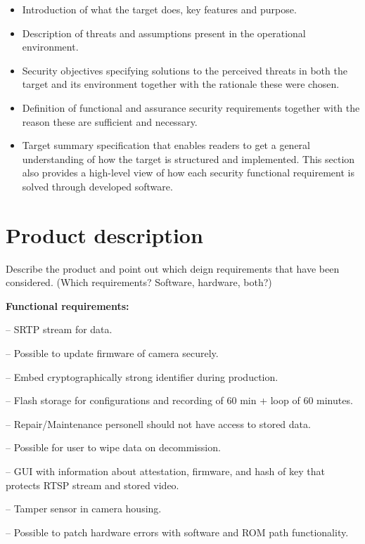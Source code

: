 \documentclass[10pt]{article}
\newcommand{\comm}[1]{{\leavevmode\color{gray}#1}}
\newenvironment{checklist}{%
  \begin{list}{}{}%
  \let\olditem\item
  \renewcommand\item{\olditem -- \marginpar{$\Box$} }
  \newcommand\checkeditem{\olditem -- \marginpar{$\CheckedBox$} }
}{%
  \end{list}
}
\begin{document}
        \begin{itemize}
          \item{Introduction of what the target does, key features and purpose.}
          \item{Description of threats and assumptions present in the
            operational environment.}
          \item{Security objectives specifying solutions to the perceived
            threats in both the target and its environment together with the
            rationale these were chosen.}
          \item{Definition of functional and assurance security requirements
            together with the reason these are sufficient and necessary.}
          \item{Target summary specification that enables readers to get a
            general understanding of how the target is structured and
            implemented. This section also provides a high-level view of how
            each security functional requirement is solved through developed
            software.}
        \end{itemize}

  \section{Product description}

    \comm{Describe the product and point out which deign requirements that have
    been considered. (Which requirements? Software, hardware, both?)}

    \textbf{Functional requirements:}
    \begin{checklist}
      \item{SRTP stream for data.}
      \item{Possible to update firmware of camera securely.}
      \item{Embed cryptographically strong identifier during production.}
      \item{Flash storage for configurations and recording of 60 min + loop of 60 minutes.}
      \item{Repair/Maintenance personell should not have access to stored data.}
      \item{Possible for user to wipe data on decommission.}
      \item{GUI with information about attestation, firmware, and hash of key
        that protects RTSP stream and stored video.}
      \item{Tamper sensor in camera housing.}
      \item{Possible to patch hardware errors with software and ROM path
        functionality.}
    \end{checklist}
\end{document}
